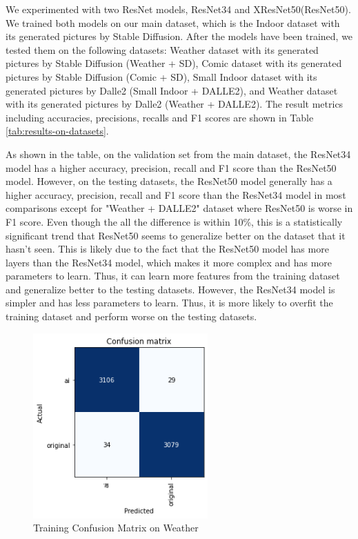 \documentclass[11pt]{article}
\begin{document}
We experimented with two ResNet models, ResNet34 and XResNet50(ResNet50). We trained both models on our main dataset, which is the Indoor dataset with its generated pictures by Stable Diffusion.  After the models have been trained, we tested them on the following datasets: Weather dataset with its generated pictures by Stable Diffusion (Weather + SD), Comic dataset with its generated pictures by Stable Diffusion (Comic + SD), Small Indoor dataset with its generated pictures by Dalle2 (Small Indoor + DALLE2), and Weather dataset with its generated pictures by Dalle2 (Weather + DALLE2). The result metrics including accuracies, precisions, recalls and F1 scores are shown in Table \ref{tab:results-on-datasets}.

As shown in the table, on the validation set from the main dataset, the ResNet34 model has a higher accuracy, precision, recall and F1 score than the ResNet50 model. However, on the testing datasets, the ResNet50 model generally has a higher accuracy, precision, recall and F1 score than the ResNet34 model in most comparisons except for "Weather + DALLE2" dataset where ResNet50 is worse in F1 score. Even though the all the difference is within 10\%, this is a statistically significant trend that ResNet50 seems to generalize better on the dataset that it hasn't seen. This is likely due to the fact that the ResNet50 model has more layers than the ResNet34 model, which makes it more complex and has more parameters to learn. Thus, it can learn more features from the training dataset and generalize better to the testing datasets. However, the ResNet34 model is simpler and has less parameters to learn. Thus, it is more likely to overfit the training dataset and perform worse on the testing datasets.

\begin{figure}[ht]
  \includegraphics[width=190pt]{./assets/paper_training_confusion_matrix.png}
  \caption{Training Confusion Matrix on Weather}
  \label{fig:paper_training_confusion_matrix}
\end{figure}
\end{document}
